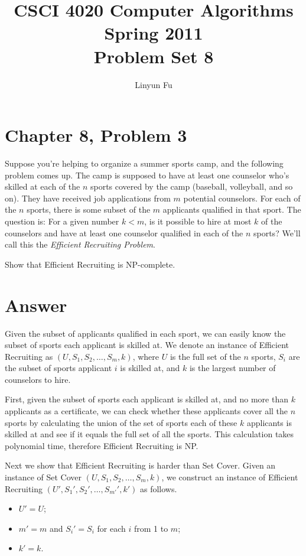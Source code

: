 \documentclass[12pt,letterpaper]{article}
\author{Linyun Fu}
\title{CSCI 4020 Computer Algorithms Spring 2011\\
Problem Set 8}
\begin{document}
\maketitle
\section*{Chapter 8, Problem 3}
Suppose you're helping to organize a summer sports camp, and the
following problem comes up. The camp is supposed to have at least
one counselor who's skilled at each of the $n$ sports covered by the camp
(baseball, volleyball, and so on). They have received job applications from
$m$ potential counselors. For each of the $n$ sports, there is some subset
of the $m$ applicants qualified in that sport. The question is: For a given
number $k < m$, is it possible to hire at most $k$ of the counselors and have
at least one counselor qualified in each of the $n$ sports? We'll call this the
{\em Efficient Recruiting Problem}.

Show that Efficient Recruiting is NP-complete.

\section*{Answer}
Given the subset of applicants qualified in each sport, we can easily know the subset of sports each applicant is skilled at. We denote an instance of Efficient Recruiting as $(U, S_1, S_2, \dots, S_m, k)$, where $U$ is the full set of the $n$ sports, $S_i$ are the subset of sports applicant $i$ is skilled at, and $k$ is the largest number of counselors to hire.

First, given the subset of sports each applicant is skilled at, and no more than $k$ applicants as a certificate, we can check whether these applicants cover all the $n$ sports by calculating the union of the set of sports each of these $k$ applicants is skilled at and see if it equals the full set of all the sports. This calculation takes polynomial time, therefore Efficient Recruiting is NP.

Next we show that Efficient Recruiting is harder than Set Cover. Given an instance of Set Cover $(U, S_1, S_2, \dots, S_m, k)$, we construct an instance of Efficient Recruiting $(U', S_1', S_2', \dots, S_{m'}', k')$ as follows.
\begin{itemize}
\item $U' = U$;
\item $m'=m$ and $S_i' = S_i$ for each $i$ from 1 to $m$;
\item $k'=k$.
\end{itemize}
\end{document}
